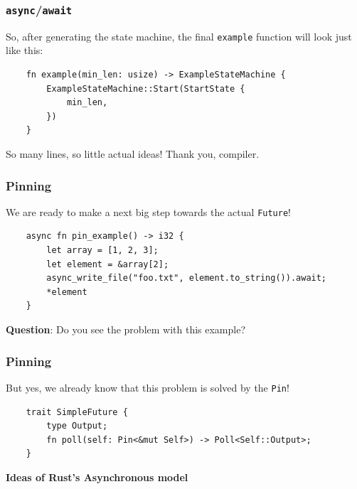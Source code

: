 \documentclass[aspectratio=1610,t]{beamer}
\begin{document}

\begin{frame}[fragile]
\frametitle{\texttt{async}/\texttt{await}}
So, after generating the state machine, the final \texttt{example} function will look just like this:

\begin{verbatim}
    fn example(min_len: usize) -> ExampleStateMachine {
        ExampleStateMachine::Start(StartState {
            min_len,
        })
    }
\end{verbatim}

So many lines, so little actual ideas! Thank you, compiler.
\end{frame}


\begin{frame}[fragile]
\frametitle{Pinning}
We are ready to make a next big step towards the actual \texttt{Future}!

\begin{verbatim}
    async fn pin_example() -> i32 {
        let array = [1, 2, 3];
        let element = &array[2];
        async_write_file("foo.txt", element.to_string()).await;
        *element
    }
\end{verbatim}

\textbf{Question}: Do you see the problem with this example?

\end{frame}


\begin{frame}[fragile]
\frametitle{Pinning}
But yes, we already know that this problem is solved by the \texttt{Pin}!

\begin{verbatim}
    trait SimpleFuture {
        type Output;
        fn poll(self: Pin<&mut Self>) -> Poll<Self::Output>;
    }
\end{verbatim}
\end{frame}


\begin{frame}[c]
\centering\Huge\textbf{Ideas of Rust's Asynchronous model}
\end{frame}
\end{document}
